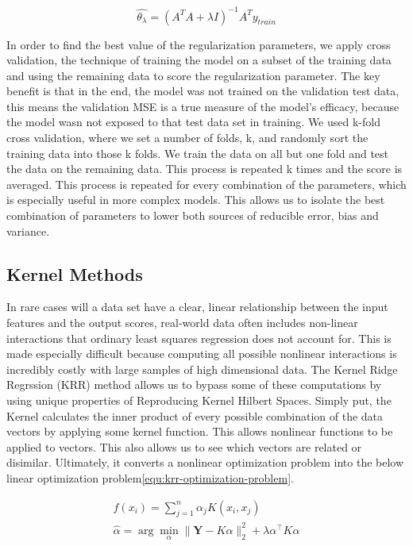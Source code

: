 \documentclass[11pt]{amsart}
\begin{document}
\begin{equation}
    \hat{\theta_\lambda} = (A^TA + \lambda I)^{-1}A^Ty_{train}
    \label{equ:ridge-regression-solution}
\end{equation}

In order to find the best value of the regularization parameters, we apply cross validation, the technique of training the model on a subset of the training data and 
using the remaining data to score the regularization parameter. The key benefit is that in the end, the model was not trained on the validation test data, this means 
the validation MSE is a true measure of the model's efficacy, because the model wasn not exposed to that test data set in training. We used k-fold cross validation, 
where we set a number of folds, k, and randomly sort the training data into those k folds. We train the data on all but one fold and test the data on the remaining data. 
This process is repeated k times and the score is averaged. This process is repeated for every combination of the parameters, which is especially useful in more complex 
models. This allows us to isolate the best combination of parameters to lower both sources of reducible error, bias and variance.

\subsection{Kernel Methods}\label{sec:Kernel-Methods}

In rare cases will a data set have a clear, linear relationship between the input features and the output scores, 
real-world data often includes non-linear interactions that ordinary least squares regression does not account for. 
This is made especially difficult because computing all possible nonlinear interactions is incredibly costly with large samples of high 
dimensional data. The Kernel Ridge Regrssion (KRR) method allows us to bypass some of these computations by using unique properties of 
Reproducing Kernel Hilbert Spaces. Simply put, the Kernel calculates the inner product of every possible combination of the data vectors by 
applying some kernel function. This allows nonlinear functions to be applied to vectors. This also allows us to see which vectors are related or disimilar. 
Ultimately, it converts a nonlinear optimization problem into the below linear optimization problem\eqref{equ:krr-optimization-problem}. 

\begin{equation}
    \begin{split}
        f(x_i) = \sum_{j=1}^{n} \alpha_j K(x_i, x_j)\\
        \hat{\alpha} = \arg\min_{\alpha} \|\mathbf{Y} - K\alpha\|_2^2 + \lambda \alpha^\top K \alpha
    \end{split}
    \label{equ:krr-optimization-problem}
\end{equation}
\end{document}
